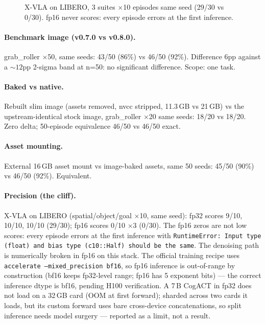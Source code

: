 \documentclass{article}
\begin{document}
\begin{figure}[t]
\centering
{}
\caption{X-VLA on LIBERO, 3 suites $\times$10 episodes same seed (29/30 vs
0/30). fp16 never scores: every episode errors at the first inference.}
\label{fig:cliff}
\end{figure}

\paragraph{Benchmark image (v0.7.0 vs v0.8.0).} grab\_roller $\times$50, same
seeds: 43/50 (86\%) vs 46/50 (92\%). Difference 6pp against a ${\sim}12$pp
2-sigma band at n=50: no significant difference. Scope: one task.

\paragraph{Baked vs native.} Rebuilt slim image (assets removed, nvcc
stripped, 11.3\,GB vs 21\,GB) vs the upstream-identical stock image,
grab\_roller $\times$20 same seeds: 18/20 vs 18/20. Zero delta; 50-episode
equivalence 46/50 vs 46/50 exact.

\paragraph{Asset mounting.} External 16\,GB asset mount vs image-baked
assets, same 50 seeds: 45/50 (90\%) vs 46/50 (92\%). Equivalent.

\paragraph{Precision (the cliff).} X-VLA on LIBERO (spatial/object/goal
$\times$10, same seed): fp32 scores 9/10, 10/10, 10/10 (29/30); fp16 scores
0/10 $\times$3 (0/30). The fp16 zeros are not low scores: every episode
errors at the first inference with
\texttt{RuntimeError: Input type (float) and bias type (c10::Half) should be
the same}. The denoising path is numerically broken in fp16 on this stack.
The official training recipe uses \texttt{accelerate --mixed\_precision bf16},
so fp16 inference is out-of-range by construction (bf16 keeps fp32-level range;
fp16 has 5 exponent bits) --- the correct inference dtype is bf16, pending
H100 verification. A 7\,B CogACT in fp32 does not load on a 32\,GB card (OOM at first forward);
sharded across two cards it loads, but its custom forward uses bare
cross-device concatenations, so split inference needs model surgery ---
reported as a limit, not a result.
\end{document}
